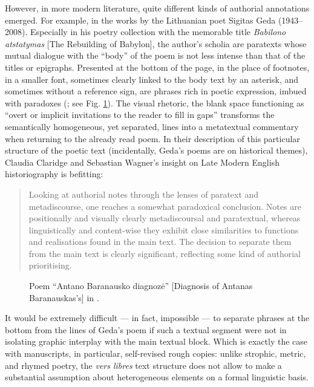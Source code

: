\begin{paper}
However, in more modern literature, quite different kinds of authorial
annotations emerged. For example, in the works by the Lithuanian poet
Sigitas Geda (1943--2008). Especially in his poetry collection with the
memorable title \emph{Babilono atstatymas} {[}The Rebuilding of
Babylon{]}, the author's scholia are paratexts whose mutual dialogue
with the ``body'' of the poem is not less intense than that of the
titles or epigraphs. Presented at the bottom of the page, in the place
of footnotes, in a smaller font, sometimes clearly linked to the body
text by an asterisk, and sometimes without a reference sign, are phrases
rich in poetic expression, imbued with paradoxes (\citealt[5 and 8]{geda_babilono_1994};
see Fig. \ref{fig:subacius7}). The visual rhetoric, the blank space functioning
as ``overt or implicit invitations to the reader to fill in gaps'' \citep[18]{maguire_rhetoric_2020}
transforms the semantically homogeneous, yet separated, lines into a
metatextual commentary when returning to the already read poem. In their description of this particular structure of the
poetic text (incidentally, Geda's poems are on historical themes),
Claudia Claridge and Sebastian Wagner's insight on Late Modern English
historiography is befitting:

\begin{quote}
Looking at authorial notes through the lenses of paratext and
metadiscourse, one reaches a somewhat paradoxical conclusion. Notes are
positionally and visually clearly metadiscoursal and paratextual,
whereas linguistically and content-wise they exhibit close similarities
to functions and realisations found in the main text. The decision to
separate them from the main text is clearly significant, reflecting some
kind of authorial prioritising.
\begin{flushright}
\citep[69]{claridge_footnote_2020}
\end{flushright}
\end{quote}

\begin{figure}[!p]
    \centering
    \caption{Poem ``Antano Baranausko diagnozė'' {[}Diagnosis of Antanas Baranauskas's{]} in \citealt[8]{geda_babilono_1994}.}
    \label{fig:subacius7}
\end{figure}

It would be extremely difficult –– in fact, impossible –– to separate
phrases at the bottom from the lines of Geda's poem if such a textual
segment were not in isolating graphic interplay with the main textual
block. Which is exactly the case with manuscripts, in particular,
self-revised rough copies: unlike
strophic, metric, and rhymed poetry, the \emph{vers libres} text
structure does not allow to make a substantial assumption about
heterogeneous elements on a formal linguistic basis.


\end{paper}
